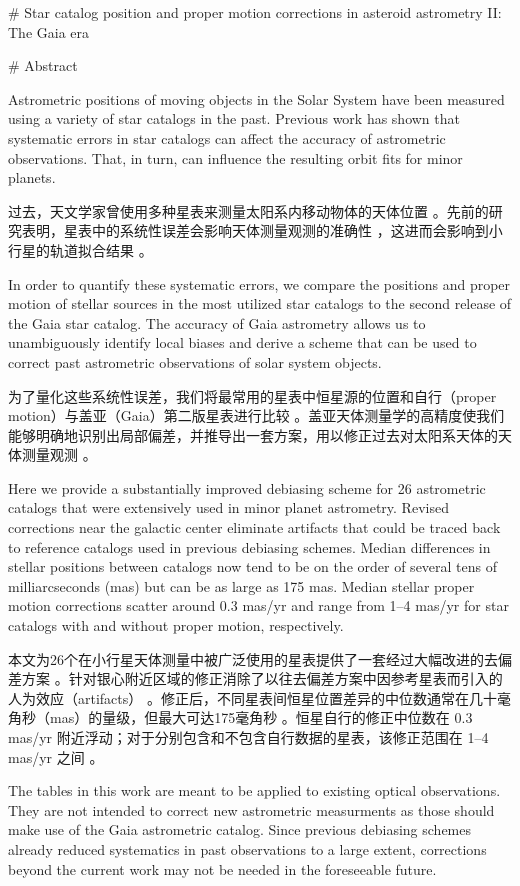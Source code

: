 # Star catalog position and proper motion corrections in asteroid astrometry II: The Gaia era

# Abstract

Astrometric positions of moving objects in the Solar System have been measured using a variety of star catalogs in the past. Previous work has shown that systematic errors in star catalogs can affect the accuracy of astrometric observations. That, in turn, can influence the resulting orbit fits for minor planets. 

过去，天文学家曾使用多种星表来测量太阳系内移动物体的天体位置 。先前的研究表明，星表中的系统性误差会影响天体测量观测的准确性 ，这进而会影响到小行星的轨道拟合结果 。

In order to quantify these systematic errors, we compare the positions and proper motion of stellar sources in the most utilized star catalogs to the second release of the Gaia star catalog. The accuracy of Gaia astrometry allows us to unambiguously identify local biases and derive a scheme that can be used to correct past astrometric observations of solar system objects. 

为了量化这些系统性误差，我们将最常用的星表中恒星源的位置和自行（proper motion）与盖亚（Gaia）第二版星表进行比较 。盖亚天体测量学的高精度使我们能够明确地识别出局部偏差，并推导出一套方案，用以修正过去对太阳系天体的天体测量观测 。

Here we provide a substantially improved debiasing scheme for 26 astrometric catalogs that were extensively used in minor planet astrometry. Revised corrections near the galactic center eliminate artifacts that could be traced back to reference catalogs used in previous debiasing schemes. Median differences in stellar positions between catalogs now tend to be on the order of several tens of milliarcseconds (mas) but can be as large as 175 mas. Median stellar proper motion corrections scatter around 0.3 mas/yr and range from 1–4 mas/yr for star catalogs with and without proper motion, respectively. 

本文为26个在小行星天体测量中被广泛使用的星表提供了一套经过大幅改进的去偏差方案 。针对银心附近区域的修正消除了以往去偏差方案中因参考星表而引入的人为效应（artifacts） 。修正后，不同星表间恒星位置差异的中位数通常在几十毫角秒（mas）的量级，但最大可达175毫角秒 。恒星自行的修正中位数在 0.3 mas/yr 附近浮动；对于分别包含和不包含自行数据的星表，该修正范围在 1–4 mas/yr 之间 。

The tables in this work are meant to be applied to existing optical observations. They are not intended to correct new astrometric measurments as those should make use of the Gaia astrometric catalog. Since previous debiasing schemes already reduced systematics in past observations to a large extent, corrections beyond the current work may not be needed in the foreseeable future.

